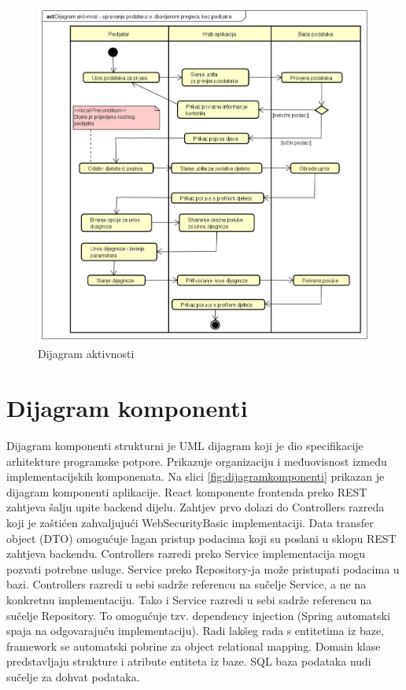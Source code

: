 			 \begin{figure}[H]
			 	\includegraphics[width=\textwidth]{dijagrami/Dijagram aktivnosti.PNG} %
			 	\caption{Dijagram aktivnosti}
			 	\label{fig:dijagramaktivnosti} %
			 \end{figure}
			
			\eject
		\section{Dijagram komponenti}
		
			 
			 Dijagram komponenti strukturni je UML dijagram koji je dio specifikacije arhitekture programske potpore. Prikazuje organizaciju i međuovisnost između implementacijskih komponenata. Na slici \ref{fig:dijagramkomponenti} prikazan je dijagram komponenti aplikacije. React komponente frontenda preko REST zahtjeva šalju upite backend dijelu. Zahtjev prvo dolazi do Controllers razreda koji je zaštićen zahvaljujući WebSecurityBasic implementaciji. Data transfer object (DTO) omogućuje lagan pristup podacima koji su poslani u sklopu REST zahtjeva backendu. Controllers razredi preko Service implementacija mogu pozvati potrebne usluge. Service preko Repository-ja može pristupati podacima u bazi. Controllers razredi u sebi sadrže referencu na sučelje Service, a ne na konkretnu implementaciju. Tako i Service razredi u sebi sadrže referencu na sučelje Repository. To omogućuje tzv. dependency injection (Spring automatski spaja na odgovarajuću implementaciju). Radi lakšeg rada s entitetima iz baze, framework se automatski pobrine za object relational mapping. Domain klase predstavljaju strukture i atribute entiteta iz baze. SQL baza podataka nudi sučelje za dohvat podataka.
			 
